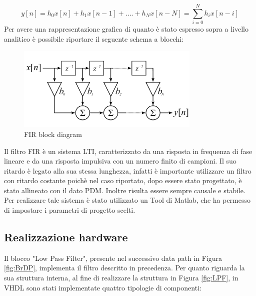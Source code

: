 \documentclass[a4paper, titlepage]{article}
\begin{document}
\begin{equation}
y\left [ n \right ]=h_{0}x\left [ n \right ]+h_{1}x\left [ n-1 \right ]+....+h_{N}x\left [ n-N \right ]=\sum_{i=0}^{N}h_{i}x\left [ n-i\right ]
\end{equation}
Per avere una rappresentazione grafica di quanto è stato espresso sopra a livello analitico è possibile riportare il seguente schema a blocchi:

\begin{figure}[H]
\centering
\includegraphics[scale=0.7]{FILTROFIR.png} 
\caption{FIR block diagram}
\label{fig:FIR}
\end{figure}

\noindent Il filtro FIR è un sistema LTI, caratterizzato da una risposta in frequenza di fase lineare e da una risposta impulsiva con un numero finito di campioni. Il suo  ritardo è legato alla sua stessa lunghezza, infatti è importante utilizzare un filtro con ritardo costante poichè nel caso riportato, dopo essere stato progettato, è stato allineato con il dato PDM. Inoltre risulta essere sempre causale e stabile.\\Per realizzare tale sistema è stato utilizzato un Tool di Matlab, che ha permesso di impostare i parametri di progetto scelti.
\subsection{Realizzazione hardware}
Il blocco "Low Pass Filter", presente nel successivo data path in Figura \ref{fig:BrDP}, implementa il filtro descritto in precedenza.
Per quanto riguarda la sua struttura interna, al fine di realizzare la struttura in Figura \ref{fig:LPF}, in VHDL sono stati implementate quattro tipologie di componenti: 
\end{document}
